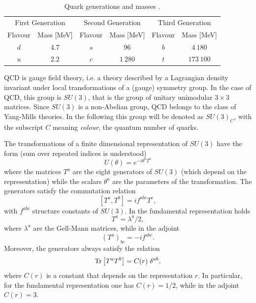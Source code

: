 \begin{table}
  \centering
  \begin{tabular}{c c c c c c}
    \toprule
    \multicolumn{2}{c}{First Generation} & \multicolumn{2}{c}{Second Generation} & \multicolumn{2}{c}{Third Generation} \\
    Flavour & Mass [MeV] & Flavour & Mass [MeV] & Flavour & Mass [MeV] \\
    \midrule
    $d$ & $4.7$ & $s$ & $96$ & $b$ & $4 \ 180$ \\
    $u$ & $2.2$ & $c$ & $1 \ 280$ & $t$ & $173 \ 100$ \\
    \bottomrule
  \end{tabular}
  \label{tab:quark_masses}
  \caption{Quark generations and masses \cite{Patrignani:2016xqp}.}
\end{table}

QCD is gauge field theory, i.e. a theory described by a Lagrangian density invariant under local transformations of a (gauge) symmetry group. In the case of QCD, this group is $SU(3)$, that is the group of unitary unimodular $3 \times 3$ matrices. Since $SU(3)$ is a non-Abelian group, QCD belongs to the class of Yang-Mills theories. In the following this group will be denoted as $SU(3)_C$, with the subscript $C$ meaning \emph{colour}, the quantum number of quarks.

The transformations of a finite dimensional representation of $SU(3)$ have the form (sum over repeated indices is understood)
\begin{equation}
  U(\theta) = e^{- i \theta^a T^a}
\end{equation}
where the matrices $T^a$ are the eight generators of $SU(3)$ (which depend on the representation) while the scalars $\theta^a$ are the parameters of the transformation. The generators satisfy the commutation relation
\begin{equation}
  \left[ T^a , T^b \right] = i f^{a b c} T^c ,
\end{equation}
with $f^{a b c}$ structure constants of $SU(3)$. In the fundamental representation holds
\begin{equation}
  T^a = \lambda^a / 2 ,
\end{equation}
where $\lambda^a$ are the Gell-Mann matrices, while in the adjoint
\begin{equation}
  (T^a)_{b c} = -i f^{a b c} . 
\end{equation}
Moreover, the generators always satisfy the relation
\begin{equation}
  \operatorname{Tr}{\left[ T^a T^b \right]} = C(r) \; \delta^{a b} ,
\end{equation}
where $C(r)$ is a constant that depends on the representation $r$. In particular, for the fundamental representation one has $C(r)=1/2$, while in the adjoint $C(r)=3$.

